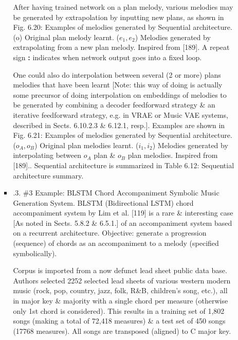 \documentclass{article}
\begin{document}
\begin{itemize}
\begin{itemize}
\begin{itemize}
			After having trained network on a plan melody, various melodies may be generated by extrapolation by inputting new plans, as shown in {\sf Fig. 6.20: Examples of melodies generated by Sequential architecture. (o) Original plan melody learnt. ($e_1,e_2$) Melodies generated by extrapolating from a new plan melody. Inspired from [189].} A repeat sign {\bf:} indicates when network output goes into a fixed loop.
			
			One could also do interpolation between several (2 or more) plans melodies that have been learnt [Note: this way of doing is actually some precursor of doing interpolation on embeddings of melodies to be generated by combining a decoder feedforward strategy \& an iterative feedforward strategy, e.g. in VRAE or Music VAE systems, described in Sects. 6.10.2.3 \& 6.12.1, resp.]. Examples are shown in {\sf Fig. 6.21: Examples of melodies generated by Sequential architecture. ($o_A,o_B$) Original plan melodies learnt. ($i_1,i_2$) Melodies generated by interpolating between $o_A$ plan \& $o_B$ plan melodies. Inspired from [189].}. Sequential architecture is summarized in {\sf Table 6.12: Sequential architecture summary}.
			\item {.3. \#3 Example: BLSTM Chord Accompaniment Symbolic Music Generation System.} BLSTM (Bidirectional LSTM) chord accompaniment system by Lim et al. [119] is a rare \& interesting case [As noted in Sects. 5.8.2 \& 6.5.1.] of an accompaniment system based on a recurrent architecture. Objective: generate a progression (sequence) of chords as an accompaniment to a melody (specified symbolically).
			
			Corpus is imported from a now defunct lead sheet public data base. Authors selected 2252 selected lead sheets of various western modern music (rock, pop, country, jazz, folk, R\&B, children's song, etc.), all in major key \& majority with a single chord per measure (otherwise only 1st chord is considered). This results in a training set of 1,802 songs (making a total of 72,418 measures) \& a test set of 450 songs (17768 measures). All songs are transposed (aligned) to C major key.
			

\end{itemize}
\end{itemize}
\end{itemize}
\end{document}
